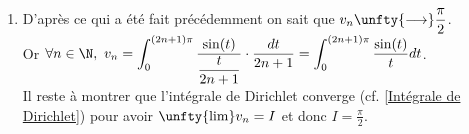 \documentclass{book}
\begin{document}
\begin{enumerate}[leftmargin=*]
		$\forall n\in \N,\ |v_n-u_n|\leq \displaystyle\frac{2M}{2n+1}+\frac{\pi M'}{2(2n+1)}\unfty{\longrightarrow}0$.\\
		Par conséquent $v_n-u_n\unfty{\longrightarrow}0$.
		\item D'après ce qui a été fait précédemment on sait que $v_n\unfty{\longrightarrow}\displaystyle\frac{\pi}{2}$.\\
		Or $\forall n\in \N,\ v_n=\displaystyle\int_0^{(2n+1)\pi}\frac{\sin(t)}{\displaystyle\frac{t}{2n+1}}\cdot\frac{dt}{2n+1}=\int_0^{(2n+1)\pi}\frac{\sin(t)}{t}dt$.\\
		Il reste à montrer que l'intégrale de Dirichlet converge (cf. \ref{Intégrale de Dirichlet}) pour avoir $\unfty{\lim}v_n=I$ et donc $I=\displaystyle\frac{\pi}{2}$.
	\end{enumerate}
	
\end{document}

